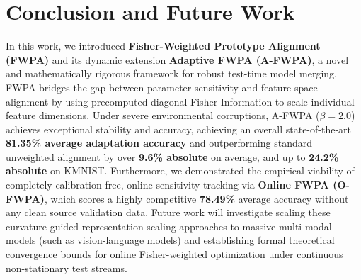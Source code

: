 \documentclass{article}
\theoremstyle{plain}
\theoremstyle{definition}
\theoremstyle{remark}
\begin{document}
\section{Conclusion and Future Work}
In this work, we introduced \textbf{Fisher-Weighted Prototype Alignment (FWPA)} and its dynamic extension \textbf{Adaptive FWPA (A-FWPA)}, a novel and mathematically rigorous framework for robust test-time model merging. FWPA bridges the gap between parameter sensitivity and feature-space alignment by using precomputed diagonal Fisher Information to scale individual feature dimensions. Under severe environmental corruptions, A-FWPA ($\beta = 2.0$) achieves exceptional stability and accuracy, achieving an overall state-of-the-art \textbf{81.35\% average adaptation accuracy} and outperforming standard unweighted alignment by over \textbf{9.6\% absolute} on average, and up to \textbf{24.2\% absolute} on KMNIST. Furthermore, we demonstrated the empirical viability of completely calibration-free, online sensitivity tracking via \textbf{Online FWPA (O-FWPA)}, which scores a highly competitive \textbf{78.49\%} average accuracy without any clean source validation data. Future work will investigate scaling these curvature-guided representation scaling approaches to massive multi-modal models (such as vision-language models) and establishing formal theoretical convergence bounds for online Fisher-weighted optimization under continuous non-stationary test streams.
\end{document}
